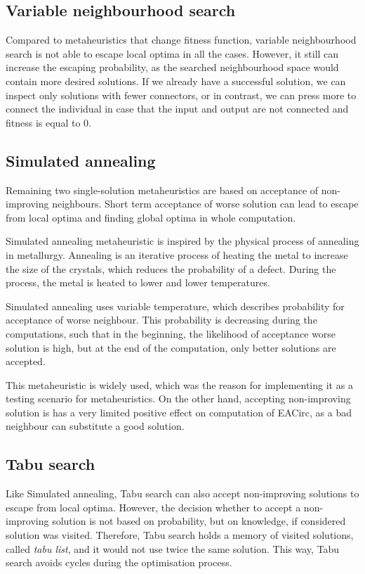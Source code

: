 \documentclass[
  print, %
  Table,   %
  nolof,     %
  nolot,     %
  draft, %
  11pt, %
  oneside  %
]{fithesis3}
\begin{document}
\subsection{Variable neighbourhood search}

Compared to metaheuristics that change fitness function, variable neighbourhood search is not able to escape local optima in all the cases. However, it still can increase the escaping probability, as the searched neighbourhood space would contain more desired solutions. If we already have a successful solution, we can inspect only solutions with fewer connectors, or in contrast, we can press more to connect the individual in case that the input and output are not connected and fitness is equal to 0.

\subsection{Simulated annealing}

Remaining two single-solution metaheuristics are based on acceptance of non-improving neighbours. Short term acceptance of worse solution can lead to escape from local optima and finding global optima in whole computation.

Simulated annealing metaheuristic is inspired by the physical process of annealing in metallurgy. Annealing is an iterative process of heating the metal to increase the size of the crystals, which reduces the probability of a defect. During the process, the metal is heated to lower and lower temperatures.

Simulated annealing uses variable temperature, which describes probability for acceptance of worse neighbour. This probability is decreasing during the computations, such that in the beginning, the likelihood of acceptance worse solution is high, but at the end of the computation, only better solutions are accepted.

This metaheuristic is widely used, which was the reason for implementing it as a testing scenario for metaheuristics. On the other hand, accepting non-improving solution is has a very limited positive effect on computation of EACirc, as a bad neighbour can substitute a good solution.

\subsection{Tabu search}

Like Simulated annealing, Tabu search can also accept non-improving solutions to escape from local optima. However, the decision whether to accept a non-improving solution is not based on probability, but on knowledge, if considered solution was visited. Therefore, Tabu search holds a memory of visited solutions, called \textit{tabu list}, and it would not use twice the same solution. This way, Tabu search avoids cycles during the optimisation process.
\end{document}
